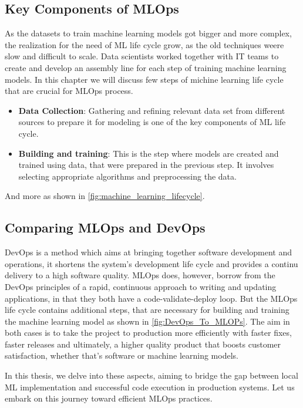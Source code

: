 \subsection{Key Components of MLOps}

As the datasets to train machine learning models got bigger and more complex, the realization for the need of \ac{ML} life cycle grow, as the old techniques weere slow and difficult to scale.
Data scientists worked together with IT teams to create and develop an assembly line for each step of training machine learning models.
In this chapter we will discuss few steps of michine learning life cycle that are crucial for \ac{MLOps} process.
\begin{itemize}
\item \textbf{Data Collection}: Gathering and refining relevant data set from different sources to prepare it for modeling is one of the key components of ML life cycle.
\item \textbf{Building and training}: This is the step  where models are created and trained using data, that were prepared in the previous step. It involves selecting appropriate algorithms and preprocessing the data.
\end{itemize}
And more as shown in \autoref{fig:machine_learning_lifecycle}.


\subsection{Comparing MLOps and DevOps}

DevOps is a method which aims at bringing together software development and operations, it shortens the system's development life cycle and provides a continu delivery to a high software quality. 
\newline
\ac{MLOps} does, however, borrow from the DevOps principles of a rapid, continuous approach to writing and updating applications, in that they both have a code-validate-deploy loop. But the \ac{MLOps} life cycle contains additional steps, that are necessary for building and training the machine learning model as shown in \autoref{fig:DevOps_To_MLOPs}.
The aim in both cases is to take the project to production more efficiently with faster fixes, faster releases and ultimately, a higher quality product that boosts customer satisfaction, whether that’s software or machine learning models.

\newline
In this thesis, we delve into these aspects, aiming to bridge the gap between local ML implementation and successful code execution in production systems. Let us embark on this journey toward efficient \ac{MLOps} practices.